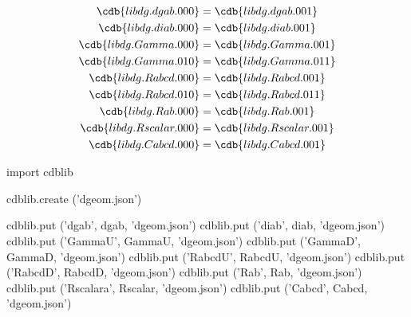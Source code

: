 \documentclass[12pt]{cdblatex}
\begin{document}
\begin{gather}
   \cdb{libdg.dgab.000}    = \cdb{libdg.dgab.001}\\
   \cdb{libdg.diab.000}    = \cdb{libdg.diab.001}\\
   \cdb{libdg.Gamma.000}   = \cdb{libdg.Gamma.001}\\
   \cdb{libdg.Gamma.010}   = \cdb{libdg.Gamma.011}\\
   \cdb{libdg.Rabcd.000}   = \cdb{libdg.Rabcd.001}\\
   \cdb{libdg.Rabcd.010}   = \cdb{libdg.Rabcd.011}\\
   \cdb{libdg.Rab.000}     = \cdb{libdg.Rab.001}\\
   \cdb{libdg.Rscalar.000} = \cdb{libdg.Rscalar.001}\\
   \cdb{libdg.Cabcd.000}   = \cdb{libdg.Cabcd.001}
\end{gather}

\clearpage


\begin{cadabra}
   import cdblib

   cdblib.create ('dgeom.json')

   cdblib.put ('dgab',     dgab,    'dgeom.json')
   cdblib.put ('diab',     diab,    'dgeom.json')
   cdblib.put ('GammaU',   GammaU,  'dgeom.json')
   cdblib.put ('GammaD',   GammaD,  'dgeom.json')
   cdblib.put ('RabcdU',   RabcdU,  'dgeom.json')
   cdblib.put ('RabcdD',   RabcdD,  'dgeom.json')
   cdblib.put ('Rab',      Rab,     'dgeom.json')
   cdblib.put ('Rscalara', Rscalar, 'dgeom.json')
   cdblib.put ('Cabcd',    Cabcd,   'dgeom.json')

\end{cadabra}
\end{document}
